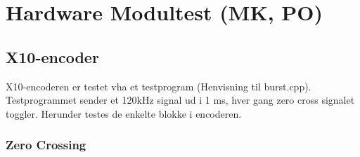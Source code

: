 \section{Hardware Modultest (MK, PO)}

\subsection{X10-encoder}
X10-encoderen er testet vha et testprogram (Henvisning til burst.cpp). Testprogrammet sender et 120kHz signal ud i 1 ms, hver gang zero cross signalet toggler. Herunder testes de enkelte blokke i encoderen.    

\subsubsection{Zero Crossing}

